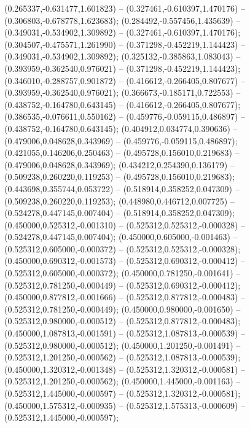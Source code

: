  (0.265337,-0.631477,1.601823) -- (0.327461,-0.610397,1.470176) -- (0.306803,-0.678778,1.623683);
 (0.284492,-0.557456,1.435639) -- (0.349031,-0.534902,1.309892) -- (0.327461,-0.610397,1.470176);
 (0.304507,-0.475571,1.261990) -- (0.371298,-0.452219,1.144423) -- (0.349031,-0.534902,1.309892);
 (0.325132,-0.385863,1.083043) -- (0.393959,-0.362540,0.976021) -- (0.371298,-0.452219,1.144423);
 (0.346010,-0.288757,0.901872) -- (0.416612,-0.266405,0.807677) -- (0.393959,-0.362540,0.976021);
 (0.366673,-0.185171,0.722553) -- (0.438752,-0.164780,0.643145) -- (0.416612,-0.266405,0.807677);
 (0.386535,-0.076611,0.550162) -- (0.459776,-0.059115,0.486897) -- (0.438752,-0.164780,0.643145);
 (0.404912,0.034774,0.390636) -- (0.479006,0.048628,0.343969) -- (0.459776,-0.059115,0.486897);
 (0.421055,0.146206,0.250463) -- (0.495728,0.156010,0.219683) -- (0.479006,0.048628,0.343969);
 (0.434212,0.254390,0.136179) -- (0.509238,0.260220,0.119253) -- (0.495728,0.156010,0.219683);
 (0.443698,0.355744,0.053722) -- (0.518914,0.358252,0.047309) -- (0.509238,0.260220,0.119253);
 (0.448980,0.446712,0.007725) -- (0.524278,0.447145,0.007404) -- (0.518914,0.358252,0.047309);
 (0.450000,0.525312,-0.001310) -- (0.525312,0.525312,-0.000328) -- (0.524278,0.447145,0.007404);
 (0.450000,0.605000,-0.001463) -- (0.525312,0.605000,-0.000372) -- (0.525312,0.525312,-0.000328);
 (0.450000,0.690312,-0.001573) -- (0.525312,0.690312,-0.000412) -- (0.525312,0.605000,-0.000372);
 (0.450000,0.781250,-0.001641) -- (0.525312,0.781250,-0.000449) -- (0.525312,0.690312,-0.000412);
 (0.450000,0.877812,-0.001666) -- (0.525312,0.877812,-0.000483) -- (0.525312,0.781250,-0.000449);
 (0.450000,0.980000,-0.001650) -- (0.525312,0.980000,-0.000512) -- (0.525312,0.877812,-0.000483);
 (0.450000,1.087813,-0.001591) -- (0.525312,1.087813,-0.000539) -- (0.525312,0.980000,-0.000512);
 (0.450000,1.201250,-0.001491) -- (0.525312,1.201250,-0.000562) -- (0.525312,1.087813,-0.000539);
 (0.450000,1.320312,-0.001348) -- (0.525312,1.320312,-0.000581) -- (0.525312,1.201250,-0.000562);
 (0.450000,1.445000,-0.001163) -- (0.525312,1.445000,-0.000597) -- (0.525312,1.320312,-0.000581);
 (0.450000,1.575312,-0.000935) -- (0.525312,1.575313,-0.000609) -- (0.525312,1.445000,-0.000597);
